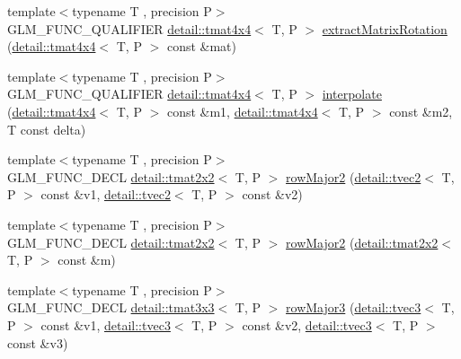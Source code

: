 \begin{DoxyCompactItemize}
\item 
{\footnotesize template$<$typename T , precision P$>$ }\\G\+L\+M\+\_\+\+F\+U\+N\+C\+\_\+\+Q\+U\+A\+L\+I\+F\+I\+ER \hyperlink{structglm_1_1detail_1_1tmat4x4}{detail\+::tmat4x4}$<$ T, P $>$ \hyperlink{group__gtx__matrix__interpolation_gacb1e3e76c1710d89a1852d87d58c021e}{extract\+Matrix\+Rotation} (\hyperlink{structglm_1_1detail_1_1tmat4x4}{detail\+::tmat4x4}$<$ T, P $>$ const \&mat)
\item 
{\footnotesize template$<$typename T , precision P$>$ }\\G\+L\+M\+\_\+\+F\+U\+N\+C\+\_\+\+Q\+U\+A\+L\+I\+F\+I\+ER \hyperlink{structglm_1_1detail_1_1tmat4x4}{detail\+::tmat4x4}$<$ T, P $>$ \hyperlink{group__gtx__matrix__interpolation_gad7dbb702234767be1b4d3c191a2327ac}{interpolate} (\hyperlink{structglm_1_1detail_1_1tmat4x4}{detail\+::tmat4x4}$<$ T, P $>$ const \&m1, \hyperlink{structglm_1_1detail_1_1tmat4x4}{detail\+::tmat4x4}$<$ T, P $>$ const \&m2, T const delta)
\item 
{\footnotesize template$<$typename T , precision P$>$ }\\G\+L\+M\+\_\+\+F\+U\+N\+C\+\_\+\+D\+E\+CL \hyperlink{structglm_1_1detail_1_1tmat2x2}{detail\+::tmat2x2}$<$ T, P $>$ \hyperlink{group__gtx__matrix__major__storage_ga63d72819ad07f4f875a0565f1462652b}{row\+Major2} (\hyperlink{structglm_1_1detail_1_1tvec2}{detail\+::tvec2}$<$ T, P $>$ const \&v1, \hyperlink{structglm_1_1detail_1_1tvec2}{detail\+::tvec2}$<$ T, P $>$ const \&v2)
\item 
{\footnotesize template$<$typename T , precision P$>$ }\\G\+L\+M\+\_\+\+F\+U\+N\+C\+\_\+\+D\+E\+CL \hyperlink{structglm_1_1detail_1_1tmat2x2}{detail\+::tmat2x2}$<$ T, P $>$ \hyperlink{group__gtx__matrix__major__storage_ga5e3cee7cdc09b9ebf0e072247a5eac54}{row\+Major2} (\hyperlink{structglm_1_1detail_1_1tmat2x2}{detail\+::tmat2x2}$<$ T, P $>$ const \&m)
\item 
{\footnotesize template$<$typename T , precision P$>$ }\\G\+L\+M\+\_\+\+F\+U\+N\+C\+\_\+\+D\+E\+CL \hyperlink{structglm_1_1detail_1_1tmat3x3}{detail\+::tmat3x3}$<$ T, P $>$ \hyperlink{group__gtx__matrix__major__storage_gaacbbf46215dff1c3da9599916ba04a94}{row\+Major3} (\hyperlink{structglm_1_1detail_1_1tvec3}{detail\+::tvec3}$<$ T, P $>$ const \&v1, \hyperlink{structglm_1_1detail_1_1tvec3}{detail\+::tvec3}$<$ T, P $>$ const \&v2, \hyperlink{structglm_1_1detail_1_1tvec3}{detail\+::tvec3}$<$ T, P $>$ const \&v3)
\item 

\end{DoxyCompactItemize}
